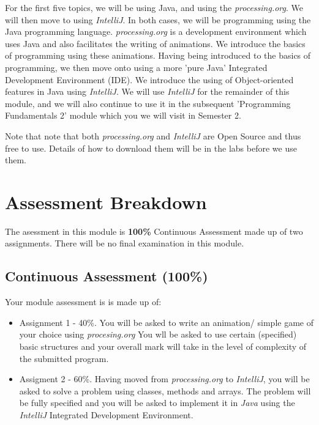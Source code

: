 \documentclass{article}
\begin{document}
For the first five topics, we will be using Java, and using the \textit{processing.org}. We will then move to using \textit{IntelliJ}. In both cases, we will be programming using the Java  programming language. 
\textit{processing.org} is a development environment which uses Java and also facilitates the writing of animations. We introduce the basics of programming using these animations. 
Having being introduced to the basics of programming, 
we then move onto using a more 'pure Java' Integrated Development Environment (IDE). We introduce the using of Object-oriented features in Java using \textit{IntelliJ}. 
We will use \textit{IntelliJ} for the remainder of this module, and we will also continue to use it in the subsequent 
'Programming Fundamentals 2' module which you we will visit in Semester 2. 

Note that note that both \textit{processing.org}   and \textit{IntelliJ} are Open Source and thus free to use. Details of how to download them will be in the labs before we use them. 
\section{Assessment Breakdown} 
The asessment in this module is \textbf{100\%} Continuous Assessment made up of two  assignments. There will be no final examination in this module. 
\subsection{Continuous Assessment (100\%) }
Your module assessment is is made up of:  
    \begin{itemize}
        \item Assignment 1 - 40\%. You will be asked to write an animation/ simple game of your choice using \textit{procesing.org}
        You wll be asked to use certain (specified) basic structures and your overall mark will take in the level of 
        complexity of the submitted program.
        \item Assigment 2 - 60\%. Having moved from \textit{processing.org} to \textit{IntelliJ}, 
        you will be asked to solve a problem using classes, methods and arrays. The problem will be fully specified and you will be asked to implement it in \textit{Java} using the \textit{IntelliJ} Integrated Development Environment.
    \end{itemize}
\end{document}
